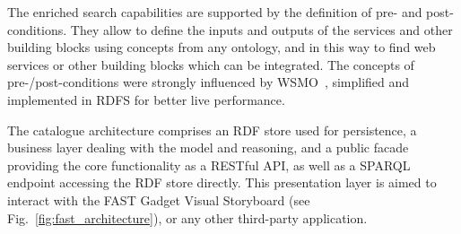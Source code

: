 % 

The enriched search capabilities are supported by the definition of pre- and post-conditions. They allow to define the inputs and outputs of the services and other building blocks using concepts from any ontology, and in this way to find web services or other building blocks which can be integrated. The concepts of pre-/post-conditions were strongly influenced by WSMO~\cite{roman2005}, simplified and implemented in RDFS for better live performance.


The catalogue architecture comprises an RDF store used for persistence, a business layer dealing with the model and reasoning, and a public facade providing the core functionality as a RESTful API, as well as a SPARQL endpoint accessing the RDF store directly. This presentation layer is aimed to interact with the FAST Gadget Visual Storyboard (see Fig.~\ref{fig:fast_architecture}), or any other third-party application.

